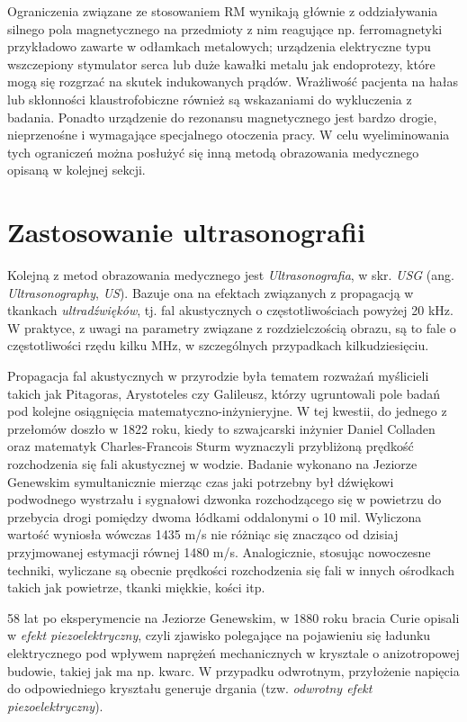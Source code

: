 Ograniczenia związane ze stosowaniem RM wynikają głównie z oddziaływania silnego pola magnetycznego na przedmioty z nim reagujące np. ferromagnetyki przykładowo zawarte w odłamkach metalowych; urządzenia elektryczne typu wszczepiony stymulator serca lub duże kawałki metalu jak endoprotezy, które mogą się rozgrzać na skutek indukowanych prądów. Wrażliwość pacjenta na hałas lub skłonności klaustrofobiczne również są wskazaniami do wykluczenia z badania. Ponadto urządzenie do rezonansu magnetycznego jest bardzo drogie, nieprzenośne i wymagające specjalnego otoczenia pracy. W celu wyeliminowania tych ograniczeń można posłużyć się inną metodą obrazowania medycznego opisaną w kolejnej sekcji. 

\section{Zastosowanie ultrasonografii}
\label{USG}

Kolejną z metod obrazowania medycznego jest \textit{Ultrasonografia}, w skr. \textit{USG} (ang. \textit{Ultrasonography}, \textit{US}). Bazuje ona na efektach związanych z propagacją w tkankach \textit{ultradźwięków}, tj. fal akustycznych o częstotliwościach powyżej 20 kHz. W praktyce, z uwagi na parametry związane z rozdzielczością obrazu, są to fale o częstotliwości rzędu kilku MHz, w szczególnych przypadkach kilkudziesięciu.

Propagacja fal akustycznych w przyrodzie była tematem rozważań myślicieli takich jak Pitagoras, Arystoteles czy Galileusz, którzy ugruntowali pole badań pod kolejne osiągnięcia matematyczno-inżynieryjne. W tej kwestii, do jednego z przełomów doszło w 1822 roku, kiedy to szwajcarski inżynier Daniel Colladen oraz matematyk Charles-Francois Sturm wyznaczyli przybliżoną prędkość rozchodzenia się fali akustycznej w wodzie. Badanie wykonano na Jeziorze Genewskim symultanicznie mierząc czas jaki potrzebny był dźwiękowi podwodnego wystrzału i sygnałowi dzwonka rozchodzącego się w powietrzu do przebycia drogi pomiędzy dwoma łódkami oddalonymi o 10 mil. Wyliczona wartość wyniosła wówczas 1435 m/s nie różniąc się znacząco od dzisiaj przyjmowanej estymacji równej 1480 m/s. Analogicznie, stosując nowoczesne techniki, wyliczane są obecnie prędkości rozchodzenia się fali w innych ośrodkach takich jak powietrze, tkanki miękkie, kości itp.

58 lat po eksperymencie na Jeziorze Genewskim, w 1880 roku bracia Curie opisali w \cite{Curie1880} \textit{efekt piezoelektryczny}, czyli zjawisko polegające na pojawieniu się ładunku elektrycznego pod wpływem naprężeń mechanicznych w krysztale o anizotropowej budowie, takiej jak ma np. kwarc. W przypadku odwrotnym, przyłożenie napięcia do odpowiedniego kryształu generuje drgania (tzw. \textit{odwrotny efekt piezoelektryczny}). 

